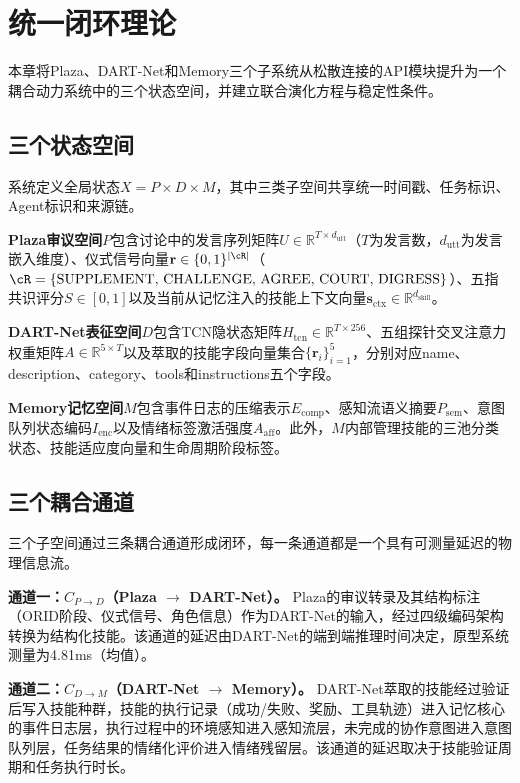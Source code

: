 \documentclass[12pt,a4paper]{ctexart}
\def\R{\mathbb{R}}
\begin{document}
\section{统一闭环理论}

本章将Plaza、DART-Net和Memory三个子系统从松散连接的API模块提升为一个耦合动力系统中的三个状态空间，并建立联合演化方程与稳定性条件。

\subsection{三个状态空间}

系统定义全局状态$X = P \times D \times M$，其中三类子空间共享统一时间戳、任务标识、Agent标识和来源链。

\textbf{Plaza审议空间$P$}包含讨论中的发言序列矩阵$U \in \R^{T \times d_{\text{utt}}}$（$T$为发言数，$d_{\text{utt}}$为发言嵌入维度）、仪式信号向量$\mathbf{r} \in \{0,1\}^{|\cR|}$（$\cR = \{\text{SUPPLEMENT, CHALLENGE, AGREE, COURT, DIGRESS}\}$）、五指共识评分$S \in [0,1]$以及当前从记忆注入的技能上下文向量$\mathbf{s}_{\text{ctx}} \in \R^{d_{\text{skill}}}$。

\textbf{DART-Net表征空间$D$}包含TCN隐状态矩阵$H_{\text{tcn}} \in \R^{T \times 256}$、五组探针交叉注意力权重矩阵$A \in \R^{5 \times T}$以及萃取的技能字段向量集合$\{\mathbf{r}_i\}_{i=1}^{5}$，分别对应name、description、category、tools和instructions五个字段。

\textbf{Memory记忆空间$M$}包含事件日志的压缩表示$E_{\text{comp}}$、感知流语义摘要$P_{\text{sem}}$、意图队列状态编码$I_{\text{enc}}$以及情绪标签激活强度$A_{\text{aff}}$。此外，$M$内部管理技能的三池分类状态、技能适应度向量和生命周期阶段标签。

\subsection{三个耦合通道}

三个子空间通过三条耦合通道形成闭环，每一条通道都是一个具有可测量延迟的物理信息流。

\textbf{通道一：$C_{P \to D}$（Plaza $\to$ DART-Net）。} Plaza的审议转录及其结构标注（ORID阶段、仪式信号、角色信息）作为DART-Net的输入，经过四级编码架构转换为结构化技能。该通道的延迟由DART-Net的端到端推理时间决定，原型系统测量为4.81ms（均值）。

\textbf{通道二：$C_{D \to M}$（DART-Net $\to$ Memory）。} DART-Net萃取的技能经过验证后写入技能种群，技能的执行记录（成功/失败、奖励、工具轨迹）进入记忆核心的事件日志层，执行过程中的环境感知进入感知流层，未完成的协作意图进入意图队列层，任务结果的情绪化评价进入情绪残留层。该通道的延迟取决于技能验证周期和任务执行时长。
\end{document}
